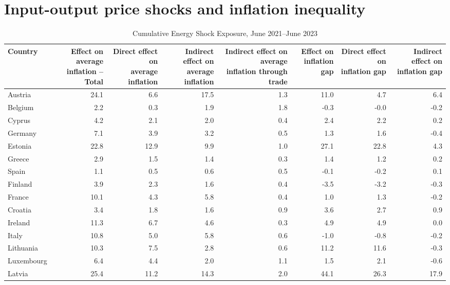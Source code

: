 \section*{Input-output price shocks and inflation inequality}
\begin{table}[H]
\centering
\caption{Cumulative Energy Shock Exposure, June 2021--June 2023}
\scriptsize
\setlength{\tabcolsep}{1.2pt}
\begin{tabular}{lrrrrrrr}
\toprule
Country & \shortstack{Effect on average\\inflation -- Total} & \shortstack{Direct effect on\\average inflation} & \shortstack{Indirect effect on\\average inflation} & \shortstack{Indirect effect on average\\inflation through trade} & \shortstack{Effect on\\inflation gap} & \shortstack{Direct effect on\\inflation gap} & \shortstack{Indirect effect on\\inflation gap}
 \\
\midrule
Austria & 24.1 & 6.6 & 17.5 & 1.3 & 11.0 & 4.7 & 6.4
 \\
Belgium & 2.2 & 0.3 & 1.9 & 1.8 & -0.3 & -0.0 & -0.2
 \\
Cyprus & 4.2 & 2.1 & 2.0 & 0.4 & 2.4 & 2.2 & 0.2
 \\
Germany & 7.1 & 3.9 & 3.2 & 0.5 & 1.3 & 1.6 & -0.4
 \\
Estonia & 22.8 & 12.9 & 9.9 & 1.0 & 27.1 & 22.8 & 4.3
 \\
Greece & 2.9 & 1.5 & 1.4 & 0.3 & 1.4 & 1.2 & 0.2
 \\
Spain & 1.1 & 0.5 & 0.6 & 0.5 & -0.1 & -0.2 & 0.1
 \\
Finland & 3.9 & 2.3 & 1.6 & 0.4 & -3.5 & -3.2 & -0.3
 \\
France & 10.1 & 4.3 & 5.8 & 0.4 & 1.0 & 1.3 & -0.2
 \\
Croatia & 3.4 & 1.8 & 1.6 & 0.9 & 3.6 & 2.7 & 0.9
 \\
Ireland & 11.3 & 6.7 & 4.6 & 0.3 & 4.9 & 4.9 & 0.0
 \\
Italy & 10.8 & 5.0 & 5.8 & 0.6 & -1.0 & -0.8 & -0.2
 \\
Lithuania & 10.3 & 7.5 & 2.8 & 0.6 & 11.2 & 11.6 & -0.3
 \\
Luxembourg & 6.4 & 4.4 & 2.0 & 1.1 & 1.5 & 2.1 & -0.6
 \\
Latvia & 25.4 & 11.2 & 14.3 & 2.0 & 44.1 & 26.3 & 17.9
 \\

\end{tabular}
\end{table}
